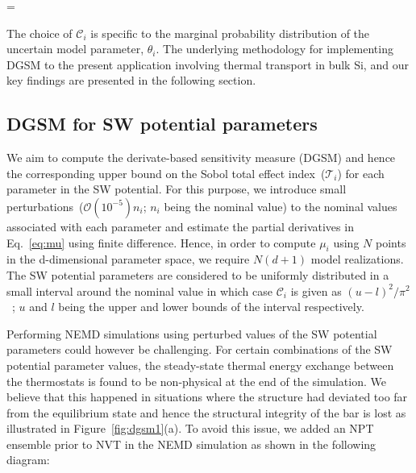 \be
{} =  
\ee

\noindent The choice of $\mathcal{C}_i$ is specific to the marginal probability distribution of the uncertain model
parameter, $\theta_i$. 
The underlying methodology for implementing DGSM to the present application involving thermal transport in bulk Si,
and our key findings are presented in the following section. 

\subsection{DGSM for SW potential parameters}
\label{sub:dgsm} 

We aim to compute the derivate-based sensitivity measure (DGSM) and hence the corresponding upper bound on the
Sobol total effect index~($\mathcal{T}_i$) for each parameter in the SW potential. For this purpose, we 
introduce small perturbations~($\mathcal{O}(10^{-5})n_i$; $n_i$ being the nominal value) to the nominal values
associated with each parameter and estimate the partial derivatives in Eq.~\ref{eq:mu} using finite difference. 
Hence, in order to compute $\mu_i$ using $N$ points in the d-dimensional parameter space, we require $N(d+1)$
model realizations. The SW potential parameters are considered to be uniformly distributed in a small interval
around the nominal value in which case $\mathcal{C}_i$ is given as $(u-l)^{2}/\pi^2$~\cite{Roustant:2014}; $u$
and $l$ being the upper and lower bounds of the interval respectively.   

Performing NEMD simulations using perturbed values of the SW potential parameters could however be challenging.
For certain combinations of the SW potential parameter values, the steady-state thermal
energy exchange between the thermostats is found to be non-physical at the end of the simulation. We believe that
this happened in situations where the structure had deviated too far from the equilibrium state and hence the
structural integrity of the bar is lost as illustrated in Figure~\ref{fig:dgsm1}(a). To avoid this
issue, we added an NPT ensemble prior to NVT in the NEMD simulation as shown in the following diagram:

